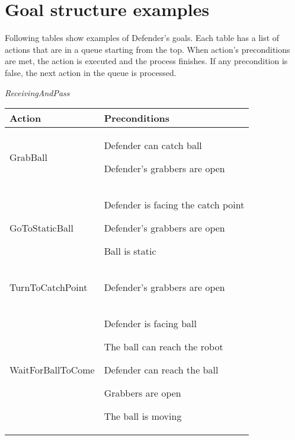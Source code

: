 \section{Goal structure examples} \label{goalstructure}

Following tables show examples of Defender's goals. Each table has a list of actions that are in a queue starting from the top. When action's preconditions are met, the action is executed and the process finishes. If any precondition is false, the next action in the queue is processed.

\emph{ReceivingAndPass}

\begin{center}


\begin{tabular}{ | l | p{110mm} | }
\hline
\textbf{Action} & \textbf{Preconditions} \\ \hline
GrabBall &
\begin{compactitem}
\item Defender can catch ball
\item Defender's grabbers are open
\end{compactitem}  \\ \hline

GoToStaticBall &
\begin{compactitem}
\item Defender is facing the catch point
\item Defender's grabbers are open
\item Ball is static
\end{compactitem}  \\ \hline

TurnToCatchPoint &
\begin{compactitem}
\item Defender's grabbers are open
\end{compactitem}  \\ \hline

WaitForBallToCome &
\begin{compactitem}
\item Defender is facing ball
\item The ball can reach the robot
\item Defender can reach the ball
\item Grabbers are open
\item The ball is moving
\end{compactitem}  \\ \hline


\end{tabular}
\end{center}
